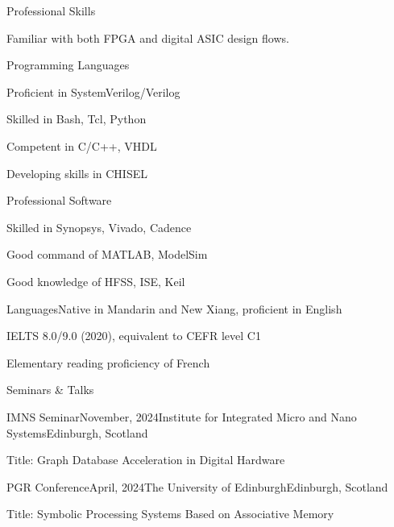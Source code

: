 \documentclass{resume} %
\begin{document}
\begin{rSection}{Professional Skills}

	Familiar with both FPGA and digital ASIC design flows. 
	
	\begin{rSubsection}{Programming Languages}{}{}{}
		\item Proficient in SystemVerilog/Verilog
		\item Skilled in Bash, Tcl, Python
		\item Competent in C/C++, VHDL
		\item Developing skills in CHISEL
	\end{rSubsection}

	\begin{rSubsection}{Professional Software}{}{}{}
		\item Skilled in Synopsys, Vivado, Cadence
		\item Good command of MATLAB, ModelSim
		\item Good knowledge of HFSS, ISE, Keil
	\end{rSubsection}

	\begin{rSubsection}{Languages}{}{Native in Mandarin and New Xiang, proficient in English}{}
		\item IELTS 8.0/9.0 (2020), equivalent to CEFR level C1
		\item Elementary reading proficiency of French
	\end{rSubsection}

\end{rSection}

\newpage

\begin{rSection}{Seminars \& Talks}
	
	
	\begin{rSubsection}{IMNS Seminar}{November, 2024}{Institute for Integrated Micro and Nano Systems}{Edinburgh, Scotland}
		\item Title: Graph Database Acceleration in Digital Hardware
	\end{rSubsection}
	
	\begin{rSubsection}{PGR Conference}{April, 2024}{The University of Edinburgh}{Edinburgh, Scotland}
		\item Title: Symbolic Processing Systems Based on Associative Memory
	\end{rSubsection}
	
\end{rSection}
\end{document}
